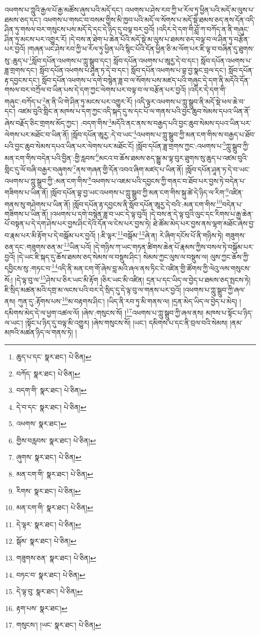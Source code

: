 འཕགས་པ་ཀླུའི་རྒྱལ་པོ་རྒྱ་མཚོས་ཞུས་པའི་མདོ་དང་། འཕགས་པ་ཤེས་རབ་ཀྱི་ཕ་རོལ་ཏུ་ཕྱིན་པའི་མདོ་མ་ལུས་པ་ཐམས་ཅད་དང་། འཕགས་པ་གསང་བ་བསམ་གྱིས་མི་ཁྱབ་པའི་མདོ་ལ་སོགས་པ་མདོ་སྡེ་ཐམས་ཅད་ནས་དོན་འདི་ཤིན་ཏུ་གསལ་བར་གསུངས་པས་མདོ་དེ་དང་དེ་ཉིད་དུ་བལྟ་བར་བྱའོ། །འདིར་དེ་དག་གི་ཤློ་ཀ་བཀོད་ན་ནི་གཞུང་ཤིན་ཏུ་མངས་པར་འགྱུར་རོ། །དེ་བས་ན་ཐེག་པ་ཆེན་པོའི་མདོ་སྡེ་མ་ལུས་པ་ཐམས་ཅད་བལྟ་བ་ལ་ཤིན་ཏུ་བརྩོན་པར་བྱའོ། །གཞན་ཡང་ཤེས་རབ་ཀྱི་ཕ་རོལ་ཏུ་ཕྱིན་པའི་སྙིང་པོའི་དོན་ཕྱིན་ཅི་མ་ལོག་པར་ཇི་ལྟ་བ་བཞིན་དུ་ཐུགས་སུ་:ཆུད་པ་\footnote{ཆུད་པ་དང་  སྣར་ཐང་།  པེ་ཅིན། }སློབ་དཔོན་འཕགས་པ་ཀླུ་སྒྲུབ་དང་། སློབ་དཔོན་འཕགས་པ་ཨཱརྱ་དེ་བ་དང་། སློབ་དཔོན་འཕགས་པ་ཟླ་གྲགས་དང་། སློབ་དཔོན་འཕགས་པ་ཤཱན་ཏ་དེ་བ་དང་། སློབ་དཔོན་འཕགས་པ་བྷ་བྱ་སྣང་བྲལ་དང་། སློབ་དཔོན་རྟ་དབྱངས་དང་། སློབ་དཔོན་འཕགས་པ་དགེ་བསྙེན་ཟླ་བ་ལ་སོགས་པས་མཛད་པའི་གཞུང་དེ་དག་ནི་མདོའི་དོན་གསལ་བར་བཀྲོལ་བ་ཡིན་པས་དེ་དག་ཀྱང་ལེགས་པར་བལྟ་བ་ལ་བརྩོན་པར་བྱའོ། །འདིར་དེ་དག་གི་གཞུང་:བཀོད་པ་\footnote{བཀོད་  སྣར་ཐང་།  པེ་ཅིན། }ན་ནི་ཡི་གེ་ཤིན་ཏུ་མངས་པར་འགྱུར་རོ། །འདི་ལྟར་འཕགས་པ་ཀླུ་སྒྲུབ་ནི་མདོ་སྡེ་ཕལ་ཆེ་བ་དང་། འཛམ་བུའི་གླིང་ན་མཁས་པ་དག་ཀྱང་འདི་སྐད་དུ་ས་དང་པོ་ལ་གནས་པའི་བྱང་ཆུབ་སེམས་དཔའ་ཡིན་ནོ་ཞེས་བརྗོད་ཅིང་གྲགས་མོད་ཀྱང་། :བདག་གིས་\footnote{བདག་གི་  སྣར་ཐང་།  པེ་ཅིན། }མདོའི་ནང་ནས་ས་བརྒྱད་པའི་བྱང་ཆུབ་སེམས་དཔའ་ཡིན་པར་ལེགས་པར་མཐོང་བ་ཡིན་ནོ། །སློབ་དཔོན་ཨཱརྱ་:དེ་བ་ཡང་\footnote{དེ་བ་དང་  སྣར་ཐང་།  པེ་ཅིན། }འཕགས་པ་ཀླུ་སྒྲུབ་ཀྱི་མན་ངག་གིས་ས་བརྒྱད་པ་ཐོབ་པའི་བྱང་ཆུབ་སེམས་དཔའ་ཡིན་པར་ལེགས་པར་མཐོང་ངོ། །སློབ་དཔོན་ཟླ་གྲགས་ཀྱང་:འཕགས་པ་\footnote{འཕགས་  སྣར་ཐང་། }ཀླུ་སྒྲུབ་ཀྱི་མན་ངག་གིས་བདེན་པའི་བྱིན་:གྱི་རླབས་\footnote{གྱིས་བརླབས་  སྣར་ཐང་།  པེ་ཅིན། }མངའ་བ་ཆོས་ཐམས་ཅད་སྒྱུ་མ་ལྟ་བུར་ཐུགས་སུ་ཆུད་པ་འཛམ་བུའི་གླིང་དུ་ལོ་བཞི་བརྒྱར་བཞུགས་\footnote{ཞུགས་  སྣར་ཐང་།  པེ་ཅིན། }ནས་གཞན་གྱི་དོན་འབའ་ཞིག་མཛད་པ་ཡིན་ནོ། །སློབ་དཔོན་ཤཱན་ཏ་དེ་བ་ཡང་འཕགས་པ་ཀླུ་སྒྲུབ་ཀྱི་:མན་ངག་གིས་\footnote{མན་ངག་གི་  སྣར་ཐང་།  པེ་ཅིན། }འཕགས་པ་འཇམ་པའི་དབྱངས་ཀྱི་གནང་བ་ཐོབ་པར་བྱས་ཏེ་བདེན་པ་གཟིགས་པ་ཡིན་ནོ། །སློབ་དཔོན་བྷ་བྱ་ཡང་འཕགས་པ་ཀླུ་སྒྲུབ་ཀྱི་མན་ངག་གིས་སྐུ་ཚེ་དེ་ཉིད་ལ་རིག་\footnote{རིགས་  སྣར་ཐང་།  པེ་ཅིན། }འཛིན་གནས་སུ་གཤེགས་པ་ཡིན་ནོ། །སློབ་དཔོན་རྟ་དབྱངས་ནི་སློབ་དཔོན་ཨཱརྱ་དེ་བའི་:མན་ངག་གིས་\footnote{མན་ངག་གི་  སྣར་ཐང་།  པེ་ཅིན། }བདེན་པ་གཟིགས་པ་ཡིན་ནོ། །འཕགས་པ་དགེ་བསྙེན་ཟླ་བ་ཡང་དེ་ལྟ་བུའོ། །དེ་བས་ན་དེ་ལྟ་བུའི་ལུང་དང་རིགས་པ་རྒྱ་ཆེན་པོ་བསྟན་པ་དེ་དག་ཤེས་པར་བྱས་ཤིང་དེའི་དོན་ལ་ངེས་པར་བྱས་ཏེ། ཐེ་ཚོམ་མེད་པར་བྱས་ནས་ལྷག་མཐོང་ཞེས་བྱ་བ་རྣམ་པར་མི་རྟོག་པ་དེ་བསྒོམ་པར་བྱའོ། །:ཇི་ལྟར་\footnote{དེ་ལྟར་  སྣར་ཐང་།  པེ་ཅིན། }བསྒོམ་\footnote{སྒོམ་  སྣར་ཐང་།  པེ་ཅིན། }ཞེ་ན། རེ་ཞིག་དངོས་པོ་ནི་གཉིས་ཏེ། གཟུགས་ཅན་དང་:གཟུགས་ཅན་མ་\footnote{གཟུགས་ཅན་  སྣར་ཐང་།  པེ་ཅིན། }ཡིན་པའོ། །དེ་གཉིས་ཀ་ཡང་གཏན་ཚིགས་ཆེན་པོ་རྣམས་ཀྱིས་བསལ་ཏེ་བསྒོམ་པར་བྱའོ། །དེ་ཡང་ཇི་སྐད་དུ་ཆོས་ཐམས་ཅད་སེམས་ལ་བསྡུས་ཤིང་། སེམས་ཀྱང་ལུས་ལ་བསྡུས་ལ། ལུས་ཀྱང་ཆོས་ཀྱི་དབྱིངས་སུ་:གཏང་བ་\footnote{བཏང་བ་  སྣར་ཐང་།  པེ་ཅིན། }འདི་ནི་མན་ངག་གོ་ཞེས་བླ་མའི་ཞལ་ནས་ཏིང་ངེ་འཛིན་གྱི་ཚོགས་ཀྱི་ལེའུ་ལས་གསུངས་སོ:། །དེ་ལྟ་བུ་ལ་\footnote{དེ་ལྟ་བུ་  སྣར་ཐང་།  པེ་ཅིན། }ཤེས་པ་ཅིར་ཡང་མི་རྟོག །ཅིར་ཡང་མི་འཛིན། དྲན་པ་དང་ཡིད་ལ་བྱེད་པ་ཐམས་ཅད་སྤངས་ཏེ། ཇི་སྲིད་མཚན་མའི་དགྲ་མ་ལངས་པའི་བར་དེ་སྲིད་དུ་དེ་ལྟ་བུ་ལ་གནས་པར་བྱའོ། །འཕགས་པ་ཀླུ་སྒྲུབ་ཀྱི་ཞལ་ནས། ཀུན་དུ་:རྟོགས་པས་\footnote{རྟག་པས་  སྣར་ཐང་། }མ་བརྟགས་ཤིང་། །ཡིད་ནི་རབ་ཏུ་མི་གནས་ལ། །དྲན་མེད་ཡིད་ལ་བྱེད་པ་མེད། །དམིགས་མེད་དེ་ལ་ཕྱག་འཚལ་ལོ། །ཞེས་:གསུངས་སོ། །\footnote{གསུངས་། །ཡང་  སྣར་ཐང་།  པེ་ཅིན། }འཕགས་པ་ཀླུ་སྒྲུབ་ཀྱི་ཞལ་ནས། མཁས་པ་སྟོང་པ་ཉིད་ལ་ཡང་། །སྟོང་པ་ཉིད་དུ་བལྟ་མི་འགྱུར། །ཞེས་གསུངས་སོ། །ཡང་། དམིགས་པ་དང་ནི་བྲལ་བའི་སེམས། །ནམ་མཁའི་མཚན་ཉིད་ལ་གནས་ཏེ། །
